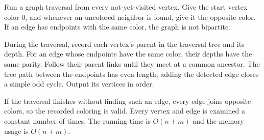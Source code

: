 Run a graph traversal from every not-yet-visited vertex. Give the start vertex color $0$, and whenever an uncolored neighbor is found, give it the opposite color. If an edge has endpoints with the same color, the graph is not bipartite.

During the traversal, record each vertex's parent in the traversal tree and its depth. For an edge whose endpoints have the same color, their depths have the same parity. Follow their parent links until they meet at a common ancestor. The tree path between the endpoints has even length; adding the detected edge closes a simple odd cycle. Output its vertices in order.

If the traversal finishes without finding such an edge, every edge joins opposite colors, so the recorded coloring is valid. Every vertex and edge is examined a constant number of times. The running time is $O(n+m)$ and the memory usage is $O(n+m)$.
